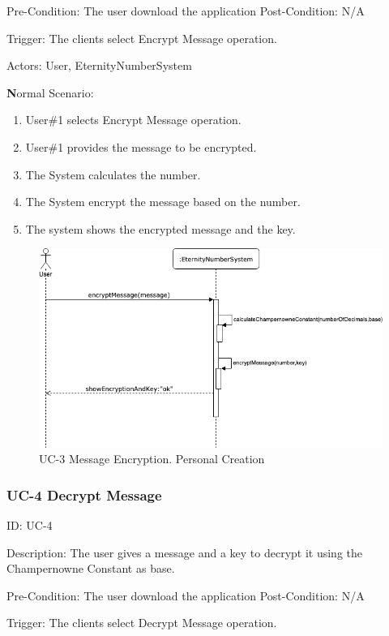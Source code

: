 \documentclass{report}
\begin{document}
Pre-Condition: The user download the application
Post-Condition: N/A

Trigger: The clients select Encrypt Message operation.

Actors: User, EternityNumberSystem

\textbf Normal Scenario:
\begin{enumerate}
\item User\#1 selects Encrypt Message operation.
\item User\#1 provides the message to be encrypted.
\item The System calculates the number.
\item The System encrypt the message based on the number.
\item The system shows the encrypted message and the key.
\newline
\end{enumerate}

\begin{figure}[H]
\includegraphics[scale=0.75]{images/MessageEncryption.png}
\caption[UC-3 Message Encryption]{UC-3 Message Encryption. Personal Creation}
\end{figure}

\subsubsection{UC-4 Decrypt Message}

ID: UC-4

Description: The user gives a message and a key to decrypt it using the Champernowne Constant as base. 

Pre-Condition: The user download the application
Post-Condition: N/A

Trigger: The clients select Decrypt Message operation.
\end{document}
